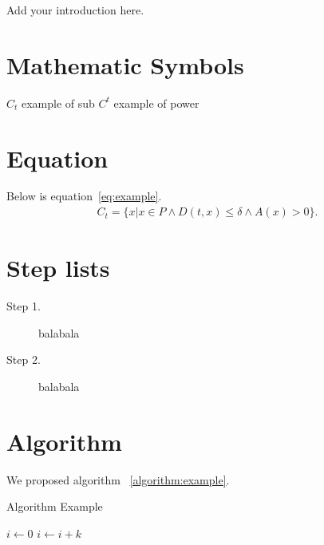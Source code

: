 \hspace{24pt}

Add your introduction here.

\section{Mathematic Symbols}
$C_t$ example of sub
$C^t$ example of power

\section{Equation}
Below is equation~\ref{eq:example}.
\begin{eqnarray}
        C_t=\{x|x \in P \wedge D(t,x) \leq \delta \wedge A(x) > 0 \}.
        \label{eq:example}
\end{eqnarray}

\section{Step lists}
\begin{description}
    \item [Step 1.] balabala
    \item [Step 2.] balabala
\end{description}

\section{Algorithm}
We proposed algorithm ~\ref{algorithm:example}.

\begin{algorithm}[H]
    \caption{Algorithm Example}
    \label{algorithm:example}
    
    \begin{algorithmic}
            \State $i\gets 0$
        \Else
                \State $i\gets i+k$
            \EndIf
        \EndIf
    \end{algorithmic}
\end{algorithm} 

